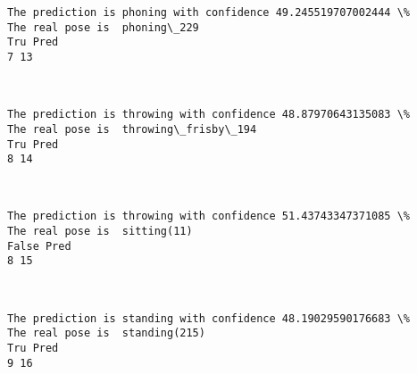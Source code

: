 \documentclass[11pt]{article}
\begin{document}
    \begin{Verbatim}[commandchars=\\\{\}]
The prediction is phoning with confidence 49.245519707002444 \%
The real pose is  phoning\_229
Tru Pred
7 13

    \end{Verbatim}

    \begin{center}
    \end{center}
    { \hspace*{\fill} \\}
    
    \begin{Verbatim}[commandchars=\\\{\}]
The prediction is throwing with confidence 48.87970643135083 \%
The real pose is  throwing\_frisby\_194
Tru Pred
8 14

    \end{Verbatim}

    \begin{center}
    \end{center}
    { \hspace*{\fill} \\}
    
    \begin{Verbatim}[commandchars=\\\{\}]
The prediction is throwing with confidence 51.43743347371085 \%
The real pose is  sitting(11)
False Pred
8 15

    \end{Verbatim}

    \begin{center}
    \end{center}
    { \hspace*{\fill} \\}
    
    \begin{Verbatim}[commandchars=\\\{\}]
The prediction is standing with confidence 48.19029590176683 \%
The real pose is  standing(215)
Tru Pred
9 16

    \end{Verbatim}

    \begin{center}
    \end{center}
    { \hspace*{\fill} \\}
    
\end{document}
